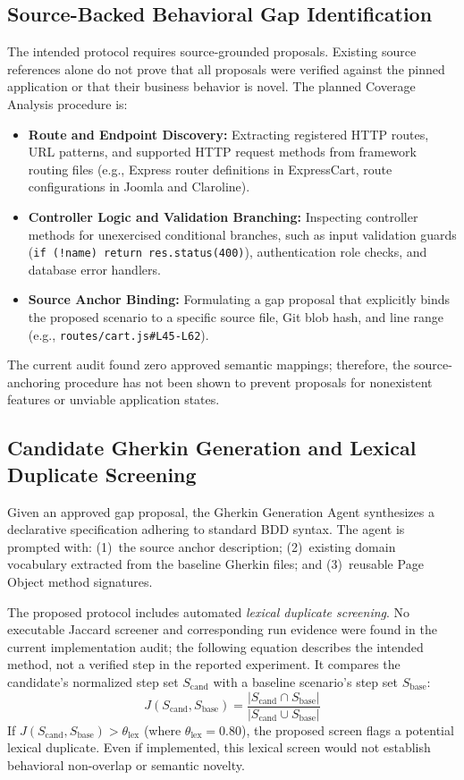 \documentclass[pdflatex,sn-mathphys-num]{sn-jnl}
\begin{document}
\subsection{Source-Backed Behavioral Gap Identification}

The intended protocol requires source-grounded proposals. Existing source references alone do not prove that all proposals were verified against the pinned application or that their business behavior is novel. The planned Coverage Analysis procedure is:
\begin{itemize}
    \item \textbf{Route and Endpoint Discovery:} Extracting registered HTTP routes, URL patterns, and supported HTTP request methods from framework routing files (e.g., Express router definitions in ExpressCart, route configurations in Joomla and Claroline).
    \item \textbf{Controller Logic and Validation Branching:} Inspecting controller methods for unexercised conditional branches, such as input validation guards (\texttt{if (!name) return res.status(400)}), authentication role checks, and database error handlers.
    \item \textbf{Source Anchor Binding:} Formulating a gap proposal that explicitly binds the proposed scenario to a specific source file, Git blob hash, and line range (e.g., \texttt{routes/cart.js\#L45-L62}).
\end{itemize}
The current audit found zero approved semantic mappings; therefore, the source-anchoring procedure has not been shown to prevent proposals for nonexistent features or unviable application states.

\subsection{Candidate Gherkin Generation and Lexical Duplicate Screening}

Given an approved gap proposal, the Gherkin Generation Agent synthesizes a declarative specification adhering to standard BDD syntax. The agent is prompted with: (1)~the source anchor description; (2)~existing domain vocabulary extracted from the baseline Gherkin files; and (3)~reusable Page Object method signatures.

The proposed protocol includes automated \textit{lexical duplicate screening}. No executable Jaccard screener and corresponding run evidence were found in the current implementation audit; the following equation describes the intended method, not a verified step in the reported experiment. It compares the candidate's normalized step set $S_{\text{cand}}$ with a baseline scenario's step set $S_{\text{base}}$:
\begin{equation}
    J(S_{\text{cand}}, S_{\text{base}}) = \frac{|S_{\text{cand}} \cap S_{\text{base}}|}{|S_{\text{cand}} \cup S_{\text{base}}|}
\end{equation}
If $J(S_{\text{cand}}, S_{\text{base}}) > \theta_{\text{lex}}$ (where $\theta_{\text{lex}} = 0.80$), the proposed screen flags a potential lexical duplicate. Even if implemented, this lexical screen would not establish behavioral non-overlap or semantic novelty.
\end{document}
